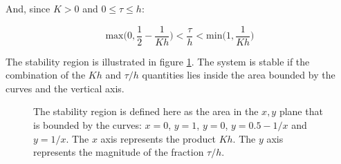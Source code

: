 And, since $K > 0$ and $0 \leq \tau \leq h$:

$$ \text{max} \Bigg(0, \dfrac{1}{2} - \dfrac{1}{Kh}\Bigg)
< \dfrac{\tau}{h} <
\text{min} \Bigg(1, \dfrac{1}{Kh} \Bigg) $$

The stability region is illustrated in figure \ref{fig:03.stability_region}.
The system is stable if the combination of the $Kh$ and $\tau/h$ quantities lies
inside the area bounded by the curves and the vertical axis.

\begin{figure}[H]\centering
  \scalebox{1}{}
  \caption{The stability region is defined here as the area in the $x,y$ plane
    that is bounded by the curves: $x=0$, $y=1$, $y=0$, $y = 0.5-1/x$ and
    $y=1/x$. The $x$ axis represents the product $Kh$. The $y$ axis represents
    the magnitude of the fraction $\tau/h$.}
  \label{fig:03.stability_region}
\end{figure}
